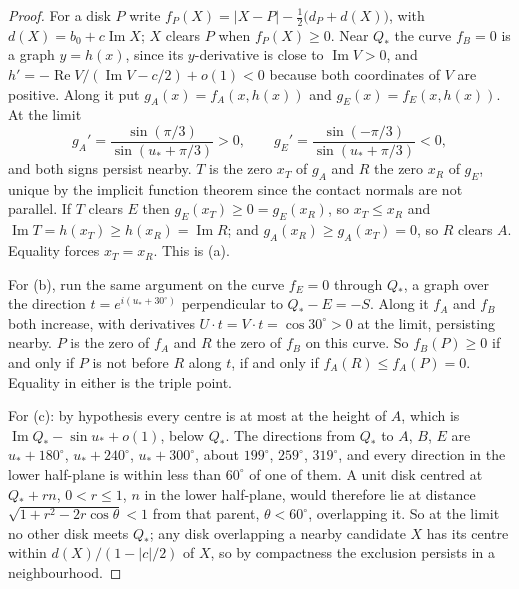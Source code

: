 \documentclass[11pt]{amsart}
\theoremstyle{definition}
\DeclareMathOperator{\Real}{Re}
\DeclareMathOperator{\Imag}{Im}
\begin{document}
\begin{proof}
For a disk $P$ write $f_P(X)=|X-P|-\tfrac12\bigl(d_P+d(X)\bigr)$, with $d(X)=b_0+c\Imag X$; $X$ clears $P$
when $f_P(X)\ge0$. Near $Q_*$ the curve $f_B=0$ is a graph $y=h(x)$, since its $y$-derivative is close to
$\Imag V>0$, and $h'=-\Real V/(\Imag V-c/2)+o(1)<0$ because both coordinates of $V$ are positive. Along it
put $g_A(x)=f_A(x,h(x))$ and $g_E(x)=f_E(x,h(x))$. At the limit
\[
g_A'=\frac{\sin(\pi/3)}{\sin(u_*+\pi/3)}>0,\qquad g_E'=\frac{\sin(-\pi/3)}{\sin(u_*+\pi/3)}<0,
\]
and both signs persist nearby. $T$ is the zero $x_T$ of $g_A$ and $R$ the zero $x_R$ of $g_E$, unique by the
implicit function theorem since the contact normals are not parallel. If $T$ clears $E$ then
$g_E(x_T)\ge0=g_E(x_R)$, so $x_T\le x_R$ and $\Imag T=h(x_T)\ge h(x_R)=\Imag R$; and
$g_A(x_R)\ge g_A(x_T)=0$, so $R$ clears $A$. Equality forces $x_T=x_R$. This is (a).

For (b), run the same argument on the curve $f_E=0$ through $Q_*$, a graph over the direction
$t=e^{i(u_*+30^\circ)}$ perpendicular to $Q_*-E=-S$. Along it $f_A$ and $f_B$ both increase, with derivatives
$U\cdot t=V\cdot t=\cos30^\circ>0$ at the limit, persisting nearby. $P$ is the zero of $f_A$ and $R$ the zero of
$f_B$ on this curve. So $f_B(P)\ge0$ if and only if $P$ is not before $R$ along $t$, if and only if
$f_A(R)\le f_A(P)=0$. Equality in either is the triple point.

For (c): by hypothesis every centre is at most at the height of $A$, which is $\Imag Q_*-\sin u_*+o(1)$,
below $Q_*$. The directions from $Q_*$ to $A$, $B$,
$E$ are $u_*+180^\circ$, $u_*+240^\circ$, $u_*+300^\circ$, about $199^\circ$, $259^\circ$, $319^\circ$, and every
direction in the lower half-plane is within less than $60^\circ$ of one of them. A unit disk centred at
$Q_*+rn$, $0<r\le1$, $n$ in the lower half-plane, would therefore lie at distance
$\sqrt{1+r^2-2r\cos\theta}<1$ from that parent, $\theta<60^\circ$, overlapping it. So at the limit no
other disk meets $Q_*$; any disk overlapping a nearby candidate $X$ has its centre within
$d(X)/(1-|c|/2)$ of $X$, so by compactness the exclusion persists in a neighbourhood.
\end{proof}
\end{document}
